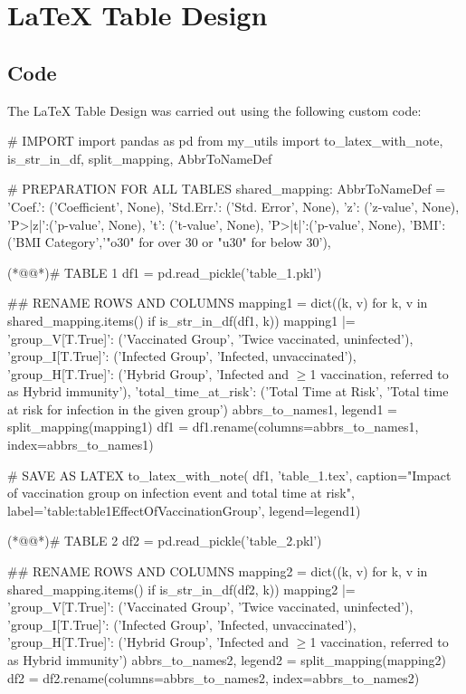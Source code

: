 \documentclass[11pt]{article}
\begin{document}
\section{LaTeX Table Design}
\subsection{{Code}}
The LaTeX Table Design was carried out using the following custom code:

\begin{python}

# IMPORT
import pandas as pd
from my_utils import to_latex_with_note, is_str_in_df, split_mapping, AbbrToNameDef

# PREPARATION FOR ALL TABLES
shared_mapping: AbbrToNameDef = {
    'Coef.': ('Coefficient', None),
    'Std.Err.': ('Std. Error', None),
    'z': ('z-value', None),
    'P>|z|':('p-value', None),
    't': ('t-value', None),
    'P>|t|':('p-value', None),
    'BMI': ('BMI Category','"o30" for over 30  or "u30" for below 30'),
}

(*@@*)# TABLE 1
df1 = pd.read_pickle('table_1.pkl')

## RENAME ROWS AND COLUMNS
mapping1 = dict((k, v) for k, v in shared_mapping.items() if is_str_in_df(df1, k)) 
mapping1 |= {
    'group_V[T.True]': ('Vaccinated Group', 'Twice vaccinated, uninfected'),
    'group_I[T.True]': ('Infected Group', 'Infected, unvaccinated'),
    'group_H[T.True]': ('Hybrid Group', 'Infected and $\geq$1 vaccination, referred to as Hybrid immunity'),
    'total_time_at_risk': ('Total Time at Risk', 'Total time at risk for infection in the given group')
}
abbrs_to_names1, legend1 = split_mapping(mapping1)
df1 = df1.rename(columns=abbrs_to_names1, index=abbrs_to_names1)

# SAVE AS LATEX
to_latex_with_note(
    df1, 'table_1.tex',
    caption="Impact of vaccination group on infection event and total time at risk", 
    label='table:table1EffectOfVaccinationGroup',
    legend=legend1)

(*@@*)# TABLE 2
df2 = pd.read_pickle('table_2.pkl')

## RENAME ROWS AND COLUMNS
mapping2 = dict((k, v) for k, v in shared_mapping.items() if is_str_in_df(df2, k)) 
mapping2 |= {
    'group_V[T.True]': ('Vaccinated Group', 'Twice vaccinated, uninfected'),
    'group_I[T.True]': ('Infected Group', 'Infected, unvaccinated'),
    'group_H[T.True]': ('Hybrid Group', 'Infected and $\geq$1 vaccination, referred to as Hybrid immunity')
}
abbrs_to_names2, legend2 = split_mapping(mapping2)
df2 = df2.rename(columns=abbrs_to_names2, index=abbrs_to_names2)


\end{python}
\end{document}

